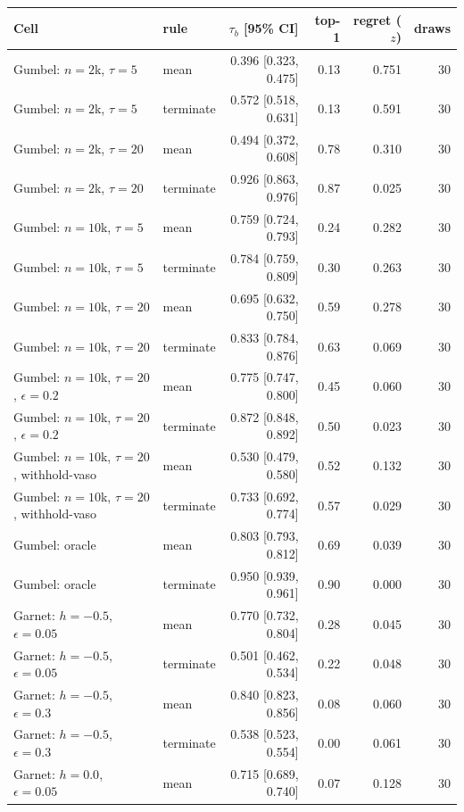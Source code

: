 \begin{tabular}{llrrrr}
\toprule
Cell & rule & $\tau_b$ [95\% CI] & top-1 & regret ($z$) & draws \\
\midrule
Gumbel: $n{=}2$k, $\tau{=}5$ & mean & 0.396 [0.323, 0.475] & 0.13 & 0.751 & 30 \\
Gumbel: $n{=}2$k, $\tau{=}5$ & terminate & 0.572 [0.518, 0.631] & 0.13 & 0.591 & 30 \\
Gumbel: $n{=}2$k, $\tau{=}20$ & mean & 0.494 [0.372, 0.608] & 0.78 & 0.310 & 30 \\
Gumbel: $n{=}2$k, $\tau{=}20$ & terminate & 0.926 [0.863, 0.976] & 0.87 & 0.025 & 30 \\
Gumbel: $n{=}10$k, $\tau{=}5$ & mean & 0.759 [0.724, 0.793] & 0.24 & 0.282 & 30 \\
Gumbel: $n{=}10$k, $\tau{=}5$ & terminate & 0.784 [0.759, 0.809] & 0.30 & 0.263 & 30 \\
Gumbel: $n{=}10$k, $\tau{=}20$ & mean & 0.695 [0.632, 0.750] & 0.59 & 0.278 & 30 \\
Gumbel: $n{=}10$k, $\tau{=}20$ & terminate & 0.833 [0.784, 0.876] & 0.63 & 0.069 & 30 \\
Gumbel: $n{=}10$k, $\tau{=}20$, $\epsilon{=}0.2$ & mean & 0.775 [0.747, 0.800] & 0.45 & 0.060 & 30 \\
Gumbel: $n{=}10$k, $\tau{=}20$, $\epsilon{=}0.2$ & terminate & 0.872 [0.848, 0.892] & 0.50 & 0.023 & 30 \\
Gumbel: $n{=}10$k, $\tau{=}20$, withhold-vaso & mean & 0.530 [0.479, 0.580] & 0.52 & 0.132 & 30 \\
Gumbel: $n{=}10$k, $\tau{=}20$, withhold-vaso & terminate & 0.733 [0.692, 0.774] & 0.57 & 0.029 & 30 \\
Gumbel: oracle & mean & 0.803 [0.793, 0.812] & 0.69 & 0.039 & 30 \\
Gumbel: oracle & terminate & 0.950 [0.939, 0.961] & 0.90 & 0.000 & 30 \\
Garnet: $h{=}{-}0.5$, $\epsilon{=}0.05$ & mean & 0.770 [0.732, 0.804] & 0.28 & 0.045 & 30 \\
Garnet: $h{=}{-}0.5$, $\epsilon{=}0.05$ & terminate & 0.501 [0.462, 0.534] & 0.22 & 0.048 & 30 \\
Garnet: $h{=}{-}0.5$, $\epsilon{=}0.3$ & mean & 0.840 [0.823, 0.856] & 0.08 & 0.060 & 30 \\
Garnet: $h{=}{-}0.5$, $\epsilon{=}0.3$ & terminate & 0.538 [0.523, 0.554] & 0.00 & 0.061 & 30 \\
Garnet: $h{=}0.0$, $\epsilon{=}0.05$ & mean & 0.715 [0.689, 0.740] & 0.07 & 0.128 & 30 \\

\end{tabular}
